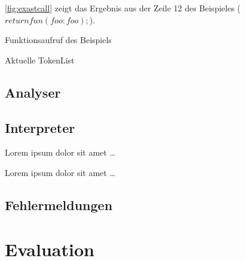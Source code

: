 {      \autoref{fig:exastcall} zeigt das Ergebnis aus der Zeile 12 des Beispieles (\myMIn$return fun(foo:foo);$).
      \begin{paracol}{2}
        \begin{myCodeEnv}
          \centering
          \begin{myInvBox}[width=.9\linewidth]
            
          \end{myInvBox}
          \caption{Funktionsaufruf des Beispiels}
          \label{fig:exastcall}
        \end{myCodeEnv}
        \switchcolumn
        \begin{myCodeEnv}
          \centering
          \begin{myInvBox}[width=.9\linewidth]
            
          \end{myInvBox}
          \caption*{Aktuelle TokenList}
        \end{myCodeEnv}
      \end{paracol}


  \subsection{Analyser}
  \label{ssec:Analyser}

  \subsection{Interpreter}
  \label{ssec:Interpreter}
    Lorem ipsum dolor sit amet \ldots

    Lorem ipsum dolor sit amet \ldots


  \subsection{Fehlermeldungen}
  \label{ssec:Fehlermeldungen}

\section{Evaluation}
\label{sec:Evaluation}

}
